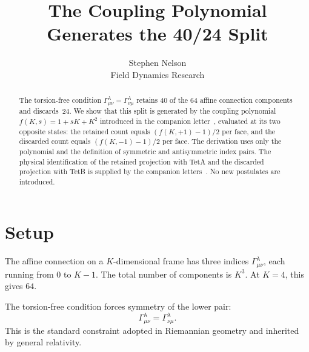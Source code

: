 \documentclass[11pt]{article}
\title{The Coupling Polynomial Generates the 40/24 Split}
\author{Stephen Nelson\\Field Dynamics Research}
\date{}
\begin{document}
\maketitle

\begin{abstract}
The torsion-free condition
$\Gamma^\lambda_{\mu\nu} = \Gamma^\lambda_{\nu\mu}$
retains 40 of the 64 affine connection components and
discards~24.  We show that this split is generated by the
coupling polynomial $f(K,s) = 1 + sK + K^2$ introduced in
the companion letter~\cite{Nelson2026b}, evaluated at its two
opposite states: the retained count equals
$(f(K,{+}1) - 1)/2$ per face, and the discarded count equals
$(f(K,{-}1) - 1)/2$ per face.  The derivation uses only the
polynomial and the definition of symmetric and antisymmetric
index pairs.  The physical identification of the retained
projection with TetA and the discarded projection with TetB
is supplied by the companion
letters~\cite{Nelson2026a,Nelson2026b}.  No new postulates
are introduced.
\end{abstract}

\section{Setup}

The affine connection on a $K$-dimensional frame has three
indices $\Gamma^\lambda_{\mu\nu}$, each running from 0 to
$K - 1$.  The total number of components is $K^3$.  At
$K = 4$, this gives $64$.

The torsion-free condition forces symmetry of the lower pair:
\begin{equation}
  \Gamma^\lambda_{\mu\nu} = \Gamma^\lambda_{\nu\mu}.
  \label{eq:torsion_free}
\end{equation}
This is the standard constraint adopted in Riemannian
geometry and inherited by general relativity.
\end{document}
